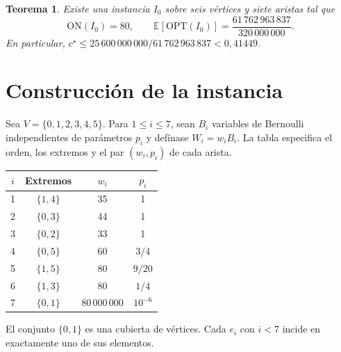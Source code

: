 \documentclass[11pt,a4paper]{article}
\newcommand{\E}{\mathbb{E}}
\newcommand{\OPT}{\mathrm{OPT}}
\newcommand{\numon}{25\,600\,000\,000}
\newcommand{\numoff}{61\,762\,963\,837}
\newcommand{\masa}{320\,000\,000}
\newtheorem{teorema}{Teorema}
\newcommand{\ON}{\mathrm{ON}}
\begin{document}
\begin{teorema}\label{thm:main}
Existe una instancia \(I_0\) sobre seis vértices y siete aristas tal que
\[
 \ON(I_0)=80,\qquad \E[\OPT(I_0)]=\frac{\numoff}{\masa}.
\]
En particular, \(c^\star\leq \numon/\numoff<0{,}41449\).
\end{teorema}

\section{Construcción de la instancia}\label{sec:inst}
Sea \(V=\{0,1,2,3,4,5\}\). Para \(1\leq i\leq 7\), sean \(B_i\) variables de Bernoulli independientes de parámetros \(p_i\) y defínase \(W_i=w_iB_i\). La tabla especifica el orden, los extremos y el par \((w_i,p_i)\) de cada arista.

\smallskip
\noindent\begin{minipage}[c]{.49\linewidth}\centering\small
\begin{tabular}{@{}cccc@{}}\toprule
\(i\)& Extremos & \(w_i\) & \(p_i\)\\\midrule
1 & \(\{1,4\}\)&35&1\\
2 & \(\{0,3\}\)&44&1\\
3 & \(\{0,2\}\)&33&1\\
4 & \(\{0,5\}\)&60&\(3/4\)\\
5 & \(\{1,5\}\)&80&\(9/20\)\\
6 & \(\{1,3\}\)&80&\(1/4\)\\
7 & \(\{0,1\}\)&\(80\,000\,000\)&\(10^{-6}\)\\\bottomrule
\end{tabular}
\end{minipage}\hfill
\begin{minipage}[c]{.47\linewidth}\centering
{}

\small El conjunto \(\{0,1\}\) es una cubierta de vértices. Cada \(e_i\) con \(i<7\) incide en exactamente uno de sus elementos.
\end{minipage}
\end{document}
